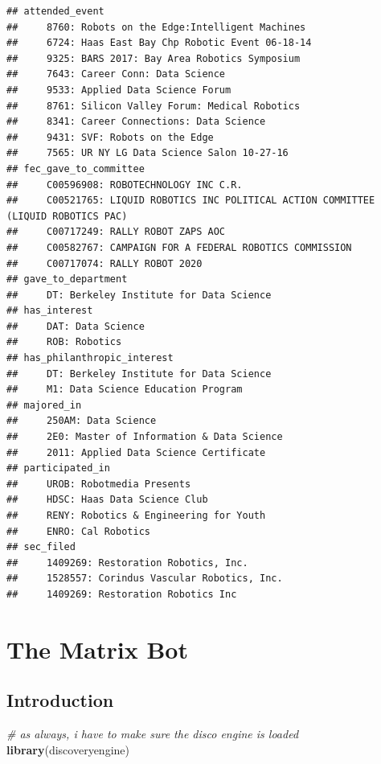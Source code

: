 \documentclass[]{book}
\newenvironment{Shaded}{\begin{snugshade}}{\end{snugshade}}
\newcommand{\CommentTok}[1]{\textcolor[rgb]{0.56,0.35,0.01}{\textit{#1}}}
\newcommand{\KeywordTok}[1]{\textcolor[rgb]{0.13,0.29,0.53}{\textbf{#1}}}
\newcommand{\NormalTok}[1]{#1}
\begin{document}
\begin{verbatim}
## attended_event 
##     8760: Robots on the Edge:Intelligent Machines
##     6724: Haas East Bay Chp Robotic Event 06-18-14
##     9325: BARS 2017: Bay Area Robotics Symposium
##     7643: Career Conn: Data Science
##     9533: Applied Data Science Forum
##     8761: Silicon Valley Forum: Medical Robotics
##     8341: Career Connections: Data Science
##     9431: SVF: Robots on the Edge
##     7565: UR NY LG Data Science Salon 10-27-16
## fec_gave_to_committee 
##     C00596908: ROBOTECHNOLOGY INC C.R.
##     C00521765: LIQUID ROBOTICS INC POLITICAL ACTION COMMITTEE (LIQUID ROBOTICS PAC)
##     C00717249: RALLY ROBOT ZAPS AOC
##     C00582767: CAMPAIGN FOR A FEDERAL ROBOTICS COMMISSION
##     C00717074: RALLY ROBOT 2020
## gave_to_department 
##     DT: Berkeley Institute for Data Science
## has_interest 
##     DAT: Data Science
##     ROB: Robotics
## has_philanthropic_interest 
##     DT: Berkeley Institute for Data Science
##     M1: Data Science Education Program
## majored_in 
##     250AM: Data Science
##     2E0: Master of Information & Data Science
##     2011: Applied Data Science Certificate
## participated_in 
##     UROB: Robotmedia Presents
##     HDSC: Haas Data Science Club
##     RENY: Robotics & Engineering for Youth
##     ENRO: Cal Robotics
## sec_filed 
##     1409269: Restoration Robotics, Inc.
##     1528557: Corindus Vascular Robotics, Inc.
##     1409269: Restoration Robotics Inc
\end{verbatim}

\hypertarget{matrix-bot}{%
\chapter{The Matrix Bot}\label{matrix-bot}}

\hypertarget{introduction}{%
\section{Introduction}\label{introduction}}

\begin{Shaded}
\begin{Highlighting}[]
\CommentTok{# as always, i have to make sure the disco engine is loaded}
\KeywordTok{library}\NormalTok{(discoveryengine)}
\end{Highlighting}
\end{Shaded}
\end{document}
